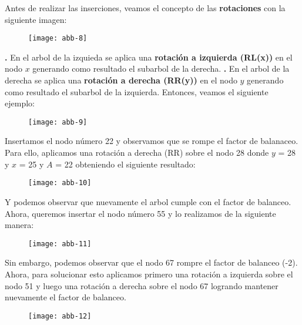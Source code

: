 \documentclass[10pt,a4paper]{article}
\begin{document}
Antes de realizar las inserciones, veamos el concepto de las \textbf{rotaciones} con la siguiente imagen: 

\begin{figure}[h]
	\centering
\texttt{[image: abb-8]}
	\label{drivers1}
\end{figure}

\textbf{.} En el arbol de la izquieda se aplica una \textbf{rotación a izquierda (RL(x))} en el nodo $x$ generando como resultado el subarbol de la derecha.
\newline
\newline
\textbf{.} En el arbol de la derecha se aplica una \textbf{rotación a derecha (RR(y))} en el nodo $y$ generando como resultado el subarbol de la izquierda.
\newline
\newline
Entonces, veamos el siguiente ejemplo:

\begin{figure}[h]
	\centering
\texttt{[image: abb-9]}
	\label{drivers1}
\end{figure}
\newpage

Insertamos el nodo número 22 y observamos que se rompe el factor de balanaceo. Para ello, aplicamos una rotación a derecha (RR) sobre el nodo 28 donde $y$ = 28 y $x$ = 25 y $A$ = 22 obteniendo el siguiente resultado:

\begin{figure}[h]
	\centering
\texttt{[image: abb-10]}
	\label{drivers1}
\end{figure}

Y podemos observar que nuevamente el arbol cumple con el factor de balanceo.
\newline
\newline
Ahora, queremos insertar el nodo número 55 y lo realizamos de la siguiente manera:

\begin{figure}[h]
	\centering
\texttt{[image: abb-11]}
	\label{drivers1}
\end{figure}

Sin embargo, podemos observar que el nodo 67 rompre el factor de balanceo (-2).
\newpage
Ahora, para solucionar esto aplicamos primero una rotación a izquierda sobre el nodo 51 y luego una rotación a derecha sobre el nodo 67 logrando mantener nuevamente el factor de balanceo.  

\begin{figure}[h]
	\centering
\texttt{[image: abb-12]}
	\label{drivers1}
\end{figure}
\end{document}
